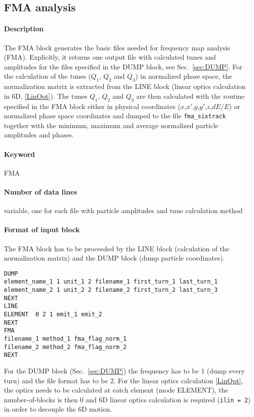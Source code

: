 \documentclass[a4paper,11pt]{report}
\begin{document}
\subsection{FMA analysis} \label{sec:FMA}

\paragraph{Description}
The FMA block generates the basic files needed for frequency map analysis (FMA). Explicitly, it returns one output file with calculated tunes and amplitudes for the files specified in the DUMP block, see Sec.~\ref{sec:DUMP}. For the calculation of the tunes ($Q_1$, $Q_2$ and $Q_3$) in normalized phase space, the normalization matrix is extracted from the LINE block (linear optics calculation in 6D, \ref{LinOpt}). The tunes $Q_1$, $Q_2$ and $Q_3$ are then calculated with the routine specified in the FMA block either in physical coordinates ($x$,$x'$,$y$,$y'$,$z$,$dE/E$) or normalized phase space coordinates and dumped to the file \verb|fma_sixtrack| together with the minimum, maximum and average normalized particle amplitudes and phases. 

\paragraph{Keyword}
FMA

\paragraph{Number of data lines}
variable, one for each file with particle amplitudes and tune calculation method

\paragraph{Format of input block}
The FMA block has to be proceeded by the LINE block (calculation of the normalization matrix) and the DUMP block (dump particle coordinates).
\begin{verbatim}
DUMP
element_name_1 1 unit_1 2 filename_1 first_turn_1 last_turn_1
element_name_2 1 unit_2 2 filename_2 first_turn_2 last_turn_3
NEXT
LINE
ELEMENT  0 2 1 emit_1 emit_2
NEXT
FMA
filename_1 method_1 fma_flag_norm_1
filename_2 method_2 fma_flag_norm_2
NEXT
\end{verbatim}
For the DUMP block (Sec.~\ref{sec:DUMP}) the frequency has to be 1 (dump every turn) and the file format has to be 2. For the linear optics calculation \ref{LinOpt}, the optics needs to be calculated at eatch element (mode ELEMENT), the number-of-blocks is then 0 and 6D linear optics calculation is required (\verb|ilin = 2|) in order to decouple the 6D motion. 
\end{document}
